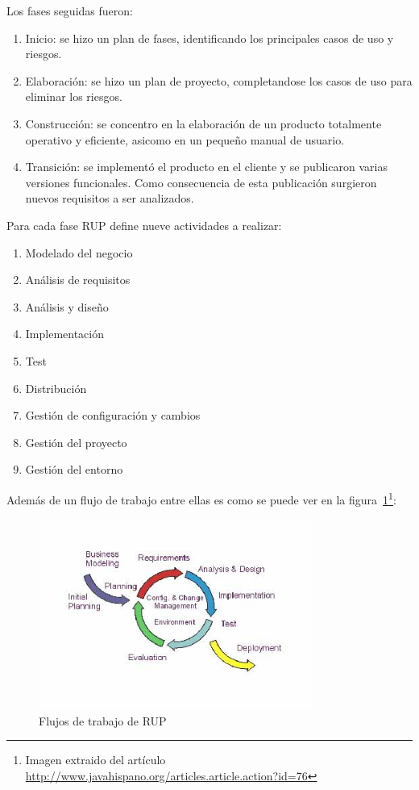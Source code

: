 Los fases seguidas fueron:

\begin{enumerate}
  \item Inicio: se hizo un plan de fases, identificando los principales 
	casos de uso y riesgos.
  \item Elaboración: se hizo un plan de proyecto, completandose los casos 
	de uso para eliminar los riesgos.
  \item Construcción: se concentro en la elaboración de un producto totalmente 
	operativo y eficiente, asicomo en un pequeño manual de usuario.
  \item Transición: se implementó el producto en el cliente y se publicaron
	varias versiones funcionales. Como consecuencia de esta publicación
	surgieron nuevos requisitos a ser analizados.
\end{enumerate}

Para cada fase RUP define nueve actividades a realizar:

\begin{enumerate}
 \item Modelado del negocio
 \item Análisis de requisitos
 \item Análisis y diseño
 \item Implementación
 \item Test
 \item Distribución
 \item Gestión de configuración y cambios
 \item Gestión del proyecto
 \item Gestión del entorno
\end{enumerate}

Además de un flujo de trabajo entre ellas es como se puede ver en la 
figura~\ref{fig:RUPWorkflow}\footnote{Imagen extraido del artículo
\url{http://www.javahispano.org/articles.article.action?id=76}}:

\begin{figure}[ht]
	\centering
	\includegraphics[width=9cm]{images/workflow-rup.png}
	\caption{Flujos de trabajo de RUP}
	\label{fig:RUPWorkflow}
\end{figure}

